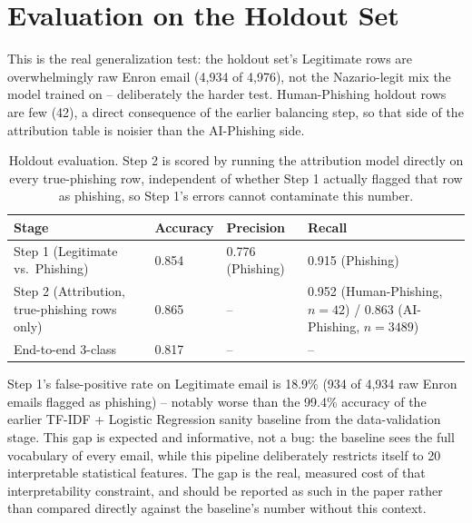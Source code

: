 \documentclass[11pt]{article}
\begin{document}
\section{Evaluation on the Holdout Set}
This is the real generalization test: the holdout set's Legitimate rows are overwhelmingly raw Enron
email (4{,}934 of 4{,}976), not the Nazario-legit mix the model trained on -- deliberately the harder
test. Human-Phishing holdout rows are few (42), a direct consequence of the earlier balancing step, so
that side of the attribution table is noisier than the AI-Phishing side.

\renewcommand{\arraystretch}{1.4}
\begin{table}[h]
\centering
\small
\begin{tabular}{@{}p{4.0cm}p{1.8cm}p{2.9cm}p{5.6cm}@{}}
\toprule
\textbf{Stage} & \textbf{Accuracy} & \textbf{Precision} & \textbf{Recall} \\
\midrule
Step 1 (Legitimate vs.\ Phishing) & 0.854 & 0.776 (Phishing) & 0.915 (Phishing) \\
Step 2 (Attribution, true-phishing rows only) & 0.865 & -- & 0.952 (Human-Phishing, $n{=}42$) / 0.863 (AI-Phishing, $n{=}3489$) \\
End-to-end 3-class & 0.817 & -- & -- \\
\bottomrule
\end{tabular}
\caption{Holdout evaluation. Step 2 is scored by running the attribution model directly on every
true-phishing row, independent of whether Step 1 actually flagged that row as phishing, so Step 1's
errors cannot contaminate this number.}
\end{table}

Step 1's false-positive rate on Legitimate email is 18.9\% (934 of 4{,}934 raw Enron emails flagged as
phishing) -- notably worse than the 99.4\% accuracy of the earlier TF-IDF + Logistic Regression sanity
baseline from the data-validation stage. This gap is expected and informative, not a bug: the baseline
sees the full vocabulary of every email, while this pipeline deliberately restricts itself to 20
interpretable statistical features. The gap is the real, measured cost of that interpretability
constraint, and should be reported as such in the paper rather than compared directly against the
baseline's number without this context.
\end{document}
